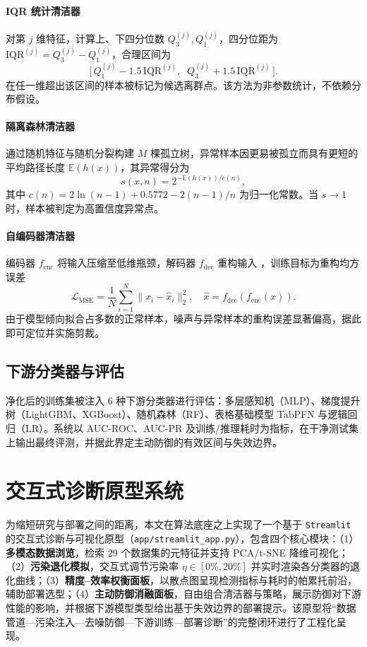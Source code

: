 \paragraph{IQR 统计清洁器} 对第 $j$ 维特征，计算上、下四分位数 $Q_3^{(j)}, Q_1^{(j)}$，四分位距为 $\text{IQR}^{(j)}=Q_3^{(j)}-Q_1^{(j)}$，合理区间为
\begin{equation}\label{eq:iqr_range}
    \big[\,Q_1^{(j)}-1.5\,\text{IQR}^{(j)},\;\; Q_3^{(j)}+1.5\,\text{IQR}^{(j)}\,\big].
\end{equation}
在任一维超出该区间的样本被标记为候选离群点。该方法为非参数统计，不依赖分布假设。

\paragraph{隔离森林清洁器} 通过随机特征与随机分裂构建 $M$ 棵孤立树，异常样本因更易被孤立而具有更短的平均路径长度 $\mathbb{E}(h(x))$，其异常得分为
\begin{equation}\label{eq:iforest_score}
    s(x,n)=2^{-\mathbb{E}(h(x))/c(n)},
\end{equation}
其中 $c(n)=2\ln(n-1)+0.5772-2(n-1)/n$ 为归一化常数。当 $s\to1$ 时，样本被判定为高置信度异常点。

\paragraph{自编码器清洁器} 编码器 $f_{\text{enc}}$ 将输入压缩至低维瓶颈，解码器 $f_{\text{dec}}$ 重构输入 \cite{an2015variational}，训练目标为重构均方误差
\begin{equation}\label{eq:ae_loss}
    \mathcal{L}_{\text{MSE}}=\frac{1}{N}\sum_{i=1}^N\|x_i-\hat{x}_i\|_2^2,\quad \hat{x}=f_{\text{dec}}(f_{\text{enc}}(x)).
\end{equation}
由于模型倾向拟合占多数的正常样本，噪声与异常样本的重构误差显著偏高，据此即可定位并实施剪裁。

\subsection{下游分类器与评估}
净化后的训练集被注入 6 种下游分类器进行评估：多层感知机（MLP）、梯度提升树（LightGBM、XGBoost）、随机森林（RF）、表格基础模型 TabPFN \cite{hollmann2022tabpfn} 与逻辑回归（LR）。系统以 AUC-ROC、AUC-PR 及训练/推理耗时为指标，在干净测试集上输出最终评测，并据此界定主动防御的有效区间与失效边界。

\section{交互式诊断原型系统}

为缩短研究与部署之间的距离，本文在算法底座之上实现了一个基于 \texttt{Streamlit} 的交互式诊断与可视化原型（\texttt{app/streamlit\_app.py}），包含四个核心模块：（1）\textbf{多模态数据浏览}，检索 29 个数据集的元特征并支持 PCA/t-SNE 降维可视化；（2）\textbf{污染退化模拟}，交互式调节污染率 $\eta\in[0\%,20\%]$ 并实时渲染各分类器的退化曲线；（3）\textbf{精度--效率权衡面板}，以散点图呈现检测指标与耗时的帕累托前沿，辅助部署选型；（4）\textbf{主动防御消融面板}，自由组合清洁器与策略，展示防御对下游性能的影响，并根据下游模型类型给出基于失效边界的部署提示。该原型将“数据管道—污染注入—去噪防御—下游训练—部署诊断”的完整闭环进行了工程化呈现。
